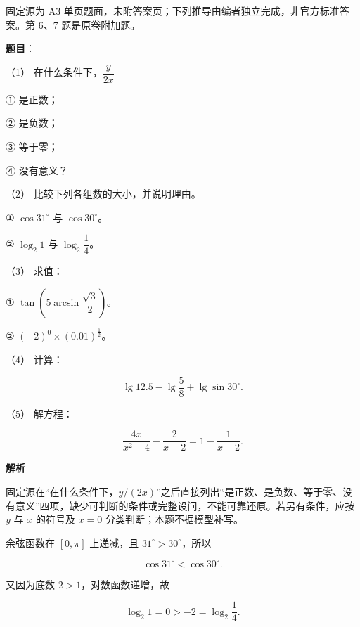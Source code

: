 

\begin{gktip}
固定源为 A3 单页题面，未附答案页；下列推导由编者独立完成，非官方标准答案。第 6、7 题是原卷附加题。
\end{gktip}

\begin{answer}

\textbf{题目}：

（1） 在什么条件下，$\dfrac{y}{2x}$

① 是正数；

② 是负数；

③ 等于零；

④ 没有意义？

（2） 比较下列各组数的大小，并说明理由。

① $\cos31^\circ$ 与 $\cos30^\circ$。

② $\log_2 1$ 与 $\log_2\dfrac14$。

（3） 求值：

① $\tan\left(5\arcsin\dfrac{\sqrt3}{2}\right)$。

② $(-2)^0\times(0.01)^{\frac12}$。

（4） 计算：

\nopagebreak[4]
\[
\lg12.5-\lg\frac58+\lg\sin30^\circ.
\]

（5） 解方程：

\nopagebreak[4]
\[
\frac{4x}{x^2-4}-\frac2{x-2}=1-\frac1{x+2}.
\]

\textbf{解析}


固定源在“在什么条件下，$y/(2x)$”之后直接列出“是正数、是负数、等于零、没有意义”四项，缺少可判断的条件或完整设问，不能可靠还原。若另有条件，应按 $y$ 与 $x$ 的符号及 $x=0$ 分类判断；本题不据模型补写。


余弦函数在 $[0,\pi]$ 上递减，且 $31^\circ>30^\circ$，所以

\nopagebreak[4]
\[
\cos31^\circ<\cos30^\circ.
\]

又因为底数 $2>1$，对数函数递增，故

\nopagebreak[4]
\[
\log_2 1=0>-2=\log_2\frac14.
\]


\end{answer}
